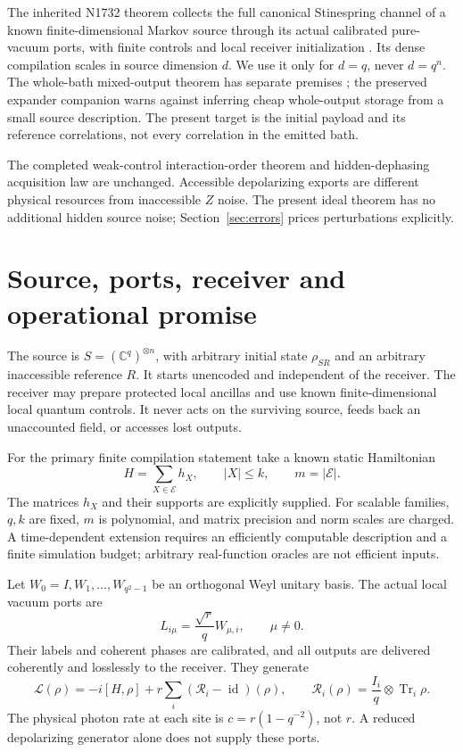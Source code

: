 \documentclass[11pt,a4paper]{article}
\newcommand{\id}{\operatorname{id}}\newcommand{\Tr}{\operatorname{Tr}}\newcommand{\osc}{\operatorname{osc}}
\begin{document}
The inherited N1732 theorem collects the full canonical Stinespring channel of a known finite-dimensional Markov source through its actual calibrated pure-vacuum ports, with finite controls and local receiver initialization \cite{astra1732}. Its dense compilation scales in source dimension $d$. We use it only for $d=q$, never $d=q^n$. The whole-bath mixed-output theorem has separate premises \cite{astra1733}; the preserved expander companion warns against inferring cheap whole-output storage from a small source description. The present target is the initial payload and its reference correlations, not every correlation in the emitted bath.

The completed weak-control interaction-order theorem and hidden-dephasing acquisition law are unchanged. Accessible depolarizing exports are different physical resources from inaccessible $Z$ noise. The present ideal theorem has no additional hidden source noise; Section~\ref{sec:errors} prices perturbations explicitly.

\section{Source, ports, receiver and operational promise}
\label{sec:model}

The source is $S=(\mathbb C^q)^{\otimes n}$, with arbitrary initial state $\rho_{SR}$ and an arbitrary inaccessible reference $R$. It starts unencoded and independent of the receiver. The receiver may prepare protected local ancillas and use known finite-dimensional local quantum controls. It never acts on the surviving source, feeds back an unaccounted field, or accesses lost outputs.

For the primary finite compilation statement take a known static Hamiltonian
\begin{equation}
H=\sum_{X\in\mathcal E}h_X,\qquad |X|\le k,\qquad m=|\mathcal E|.
\end{equation}
The matrices $h_X$ and their supports are explicitly supplied. For scalable families, $q,k$ are fixed, $m$ is polynomial, and matrix precision and norm scales are charged. A time-dependent extension requires an efficiently computable description and a finite simulation budget; arbitrary real-function oracles are not efficient inputs.

Let $W_0=I,W_1,\ldots,W_{q^2-1}$ be an orthogonal Weyl unitary basis. The actual local vacuum ports are
\begin{equation}
L_{i\mu}=\frac{\sqrt r}{q}W_{\mu,i},\qquad \mu\ne0.
\end{equation}
Their labels and coherent phases are calibrated, and all outputs are delivered coherently and losslessly to the receiver. They generate
\begin{equation}
\mathcal L(\rho)=-i[H,\rho]+r\sum_i(\mathcal R_i-\id)(\rho),\qquad
\mathcal R_i(\rho)=\frac{I_i}{q}\otimes\Tr_i\rho.
\end{equation}
The physical photon rate at each site is $c=r(1-q^{-2})$, not $r$. A reduced depolarizing generator alone does not supply these ports.
\end{document}
